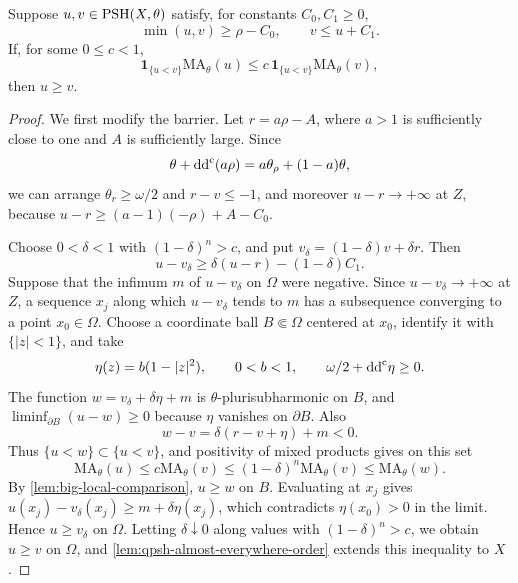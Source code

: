 \begin{theorem}\label{thm:big-barrier-domination}
Suppose $u,v\in\mathrm{PSH}(X,\theta)$ satisfy, for constants $C_0,C_1\geq0$,
\[
 \min(u,v)\geq\rho-C_0,\qquad v\leq u+C_1.
\]
If, for some $0\leq c<1$,
\[
 \mathbf1_{\{u<v\}}\mathrm{MA}_\theta(u)\leq
 c\,\mathbf1_{\{u<v\}}\mathrm{MA}_\theta(v),
\]
then $u\geq v$.
\end{theorem}
\begin{proof}
We first modify the barrier. Let $r=a\rho-A$, where $a>1$ is sufficiently close to one and $A$ is sufficiently large. Since
\[
 \theta+\mathrm{dd}^{\mathrm{c}}(a\rho)=a\theta_\rho+(1-a)\theta,
\]
we can arrange $\theta_r\geq\omega/2$ and $r-v\leq-1$, and moreover $u-r\to+\infty$ at $Z$, because $u-r\geq(a-1)(-\rho)+A-C_0$.

Choose $0<\delta<1$ with $(1-\delta)^n>c$, and put $v_\delta=(1-\delta)v+\delta r$. Then
\[
 u-v_\delta\geq\delta(u-r)-(1-\delta)C_1.
\]
Suppose that the infimum $m$ of $u-v_\delta$ on $\Omega$ were negative. Since $u-v_\delta\to+\infty$ at $Z$, a sequence $x_j$ along which $u-v_\delta$ tends to $m$ has a subsequence converging to a point $x_0\in\Omega$. Choose a coordinate ball $B\Subset\Omega$ centered at $x_0$, identify it with $\{|z|<1\}$, and take
\[
 \eta(z)=b(1-|z|^2),\qquad 0<b<1,
 \qquad \omega/2+\mathrm{dd}^{\mathrm{c}}\eta\geq0.
\]
The function $w=v_\delta+\delta\eta+m$ is $\theta$-plurisubharmonic on $B$, and $\liminf_{\partial B}(u-w)\geq0$ because $\eta$ vanishes on $\partial B$. Also
\[
 w-v=\delta(r-v+\eta)+m<0.
\]
Thus $\{u<w\}\subset\{u<v\}$, and positivity of mixed products gives on this set
\[
 \mathrm{MA}_\theta(u)\leq c\mathrm{MA}_\theta(v)\leq(1-\delta)^n\mathrm{MA}_\theta(v)\leq\mathrm{MA}_\theta(w).
\]
By \cref{lem:big-local-comparison}, $u\geq w$ on $B$. Evaluating at $x_j$ gives $u(x_j)-v_\delta(x_j)\geq m+\delta\eta(x_j)$, which contradicts $\eta(x_0)>0$ in the limit. Hence $u\geq v_\delta$ on $\Omega$. Letting $\delta\downarrow0$ along values with $(1-\delta)^n>c$, we obtain $u\geq v$ on $\Omega$, and \cref{lem:qpsh-almost-everywhere-order} extends this inequality to $X$.
\end{proof}


